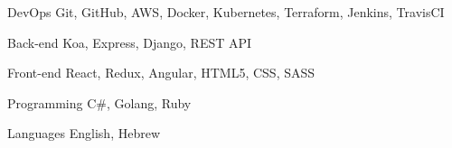 

\begin{cvskills}

  \cvskill
    {DevOps} %
    {Git, GitHub, AWS, Docker, Kubernetes, Terraform, Jenkins, TravisCI} %

  \cvskill
    {Back-end} %
    {Koa, Express, Django, REST API} %

  \cvskill
    {Front-end} %
    {React, Redux, Angular, HTML5, CSS, SASS} %

  \cvskill
    {Programming} %
    {C\#, Golang, Ruby} %

  \cvskill
    {Languages} %
    {English, Hebrew} %

\end{cvskills}

